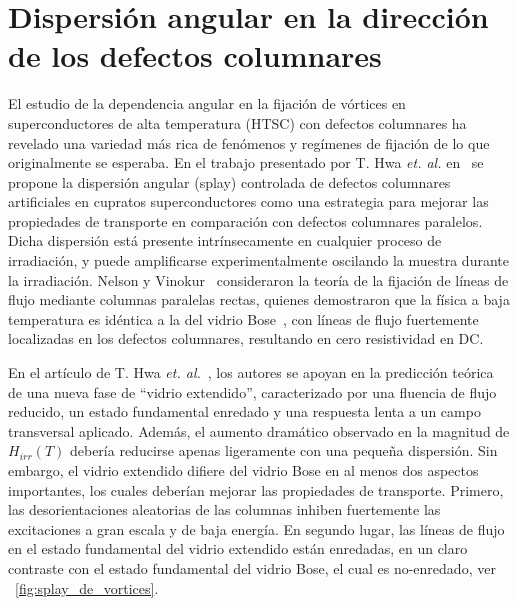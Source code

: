 \documentclass[a4paper,conference]{IEEEtran}
\begin{document}
\section{Dispersi\'{o}n angular en la direcci\'{o}n de los defectos
columnares}\label{sec:splay}

El estudio de la dependencia angular en la fijaci\'{o}n de v\'{o}rtices en
superconductores de alta temperatura (HTSC) con defectos columnares ha revelado
una variedad m\'{a}s rica de fen\'{o}menos y reg\'{i}menes de fijaci\'{o}n de lo
que originalmente se esperaba.
En el trabajo presentado por T. Hwa \textit{et. al.} en~\cite{Hwa1994} se
propone la dispersi\'{o}n angular (splay) controlada de defectos columnares
artificiales en cupratos superconductores como una estrategia para mejorar las
propiedades de transporte en comparaci\'{o}n con defectos columnares paralelos.
Dicha dispersi\'{o}n est\'{a} presente intr\'{i}nsecamente en cualquier proceso
de irradiaci\'{o}n, y puede amplificarse experimentalmente oscilando la muestra
durante la irradiaci\'{o}n.  Nelson y Vinokur~\cite{Nelson1993} consideraron la
teor\'{i}a de la fijaci\'{o}n de l\'{i}neas de flujo mediante columnas paralelas
rectas, quienes demostraron que la f\'{i}sica a baja temperatura es id\'{e}ntica
a la del vidrio Bose~\cite{Fisher1989}, con l\'{i}neas de flujo fuertemente
localizadas en los defectos columnares, resultando en cero resistividad en DC.

En el art\'{i}culo de T. Hwa \textit{et. al.}~\cite{Hwa1994}, los autores se
apoyan en la predicci\'{o}n te\'{o}rica de una nueva fase de ``vidrio
extendido'', caracterizado por una fluencia de flujo reducido, un estado
fundamental enredado y una respuesta lenta a un campo transversal aplicado.  
Adem\'{a}s, el aumento dram\'{a}tico observado en la magnitud de $H_{irr}(T)$
deber\'{i}a reducirse apenas ligeramente con una peque\~{n}a dispersi\'{o}n.
Sin embargo, el vidrio extendido difiere del vidrio Bose en al menos dos
aspectos importantes, los cuales deber\'{i}an mejorar las propiedades de
transporte. Primero, las desorientaciones aleatorias de las columnas inhiben
fuertemente las excitaciones a gran escala y de baja energ\'{i}a. En segundo
lugar, las l\'{i}neas de flujo en el estado fundamental del vidrio extendido
est\'{a}n enredadas, en un claro contraste con el estado fundamental del vidrio
Bose, el cual es no-enredado, ver \figurename~\ref{fig:splay_de_vortices}.
\end{document}
